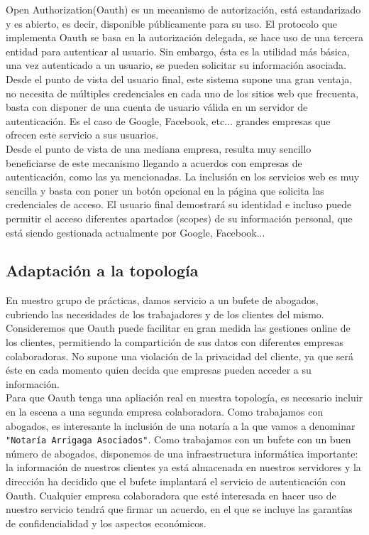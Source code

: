 \documentclass[a4,12pt,onecolum]{article}
\begin{document}
Open Authorization(Oauth) es un mecanismo de autorización, está estandarizado y es abierto, es decir, disponible públicamente para su uso. El protocolo que implementa Oauth se basa en la autorización delegada, se hace uso de una tercera entidad para autenticar al usuario. Sin embargo, ésta es la utilidad más básica, una vez autenticado a un usuario, se pueden solicitar su información asociada. \\

Desde el punto de vista del usuario final, este sistema supone una gran ventaja, no necesita de múltiples credenciales en cada uno de los sitios web que frecuenta, basta con disponer de una cuenta de usuario válida en un servidor de autenticación. Es el caso de Google, Facebook, etc... grandes empresas que ofrecen este servicio a sus usuarios. \\

Desde el punto de vista de una mediana empresa, resulta muy sencillo beneficiarse de este mecanismo llegando a acuerdos con empresas de autenticación, como las ya mencionadas. La inclusión en los servicios web es muy sencilla y basta con poner un botón opcional en la página que solicita las credenciales de acceso. El usuario final demostrará su identidad e incluso puede permitir el acceso diferentes apartados (scopes) de su información personal, que está siendo gestionada actualmente por Google, Facebook...


\subsection{Adaptación a la topología}
En nuestro grupo de prácticas, damos servicio a un bufete de abogados, cubriendo las necesidades de los trabajadores y de los clientes del mismo. Consideremos que Oauth puede facilitar en gran medida las gestiones online de los clientes, permitiendo la compartición de sus datos con diferentes empresas colaboradoras. No supone una violación de la privacidad del cliente, ya que será éste en cada momento quien decida que empresas pueden acceder a su información.	\\

Para que Oauth tenga una apliación real en nuestra topología, es necesario incluir en la escena a una segunda empresa colaboradora. Como trabajamos con abogados, es interesante la inclusión de una notaría a la que vamos a denominar \texttt{"Notaría Arrigaga Asociados"}. Como trabajamos con un bufete con un buen número de abogados, disponemos de una infraestructura informática  importante: la información de nuestros clientes ya está almacenada en nuestros servidores y la dirección ha decidido que el bufete implantará el servicio de autenticación con Oauth. Cualquier empresa colaboradora que esté interesada en hacer uso de nuestro servicio tendrá que firmar un acuerdo, en el que se incluye las garantías de confidencialidad y los aspectos económicos.	\\
\end{document}
